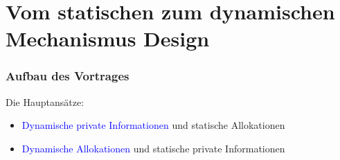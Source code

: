 \section{Vom statischen zum dynamischen Mechanismus Design}

\begin{frame}
\frametitle{Aufbau des Vortrages}
\justifying
Die Hauptans\"atze:
\begin{itemize}
    \item \textcolor{blue}{Dynamische private Informationen} und statische Allokationen
    \item \textcolor{blue}{Dynamische Allokationen} und statische private Informationen
\end{itemize}

\end{frame}
